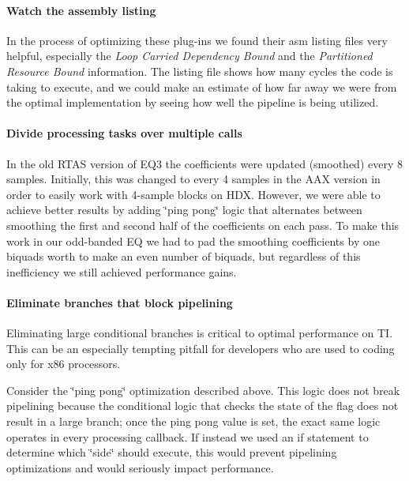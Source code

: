 \hypertarget{a00832_subsubsection__watch_the_assembly_listing_}{}\paragraph{Watch the assembly listing}\label{a00832_subsubsection__watch_the_assembly_listing_}
 In the process of optimizing these plug-\/ins we found their asm listing files very helpful, especially the {\itshape  Loop Carried Dependency Bound} and the {\itshape  Partitioned Resource Bound} information. The listing file shows how many cycles the code is taking to execute, and we could make an estimate of how far away we were from the optimal implementation by seeing how well the pipeline is being utilized.

\hypertarget{a00832_subsubsection__divide_processing_tasks_over_multiple_calls_}{}\paragraph{Divide processing tasks over multiple calls}\label{a00832_subsubsection__divide_processing_tasks_over_multiple_calls_}
 In the old R\+T\+AS version of E\+Q3 the coefficients were updated (smoothed) every 8 samples. Initially, this was changed to every 4 samples in the A\+AX version in order to easily work with 4-\/sample blocks on H\+DX. However, we were able to achieve better results by adding \char`\"{}ping pong\char`\"{} logic that alternates between smoothing the first and second half of the coefficients on each pass. To make this work in our odd-\/banded EQ we had to pad the smoothing coefficients by one biquad\textquotesingle{}s worth to make an even number of biquads, but regardless of this inefficiency we still achieved performance gains.

\hypertarget{a00832_subsubsection__eliminate_branches_that_block_pipelining_}{}\paragraph{Eliminate branches that block pipelining}\label{a00832_subsubsection__eliminate_branches_that_block_pipelining_}
 Eliminating large conditional branches is critical to optimal performance on TI. This can be an especially tempting pitfall for developers who are used to coding only for x86 processors.

Consider the \char`\"{}ping pong\char`\"{} optimization described above. This logic does not break pipelining because the conditional logic that checks the state of the flag does not result in a large branch; once the ping pong value is set, the exact same logic operates in every processing callback. If instead we used an if statement to determine which \char`\"{}side\char`\"{} should execute, this would prevent pipelining optimizations and would seriously impact performance.

